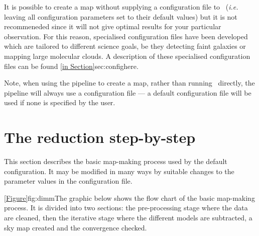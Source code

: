 It is possible to create a map without supplying a configuration file to
\makemap\ (\emph{i.e.} leaving all configuration parameters set to their default
values) but it is not recommeneded since it will not give optimal results
for your particular observation. For this reason, specialised
configuration files have been developed which are tailored to different
science goals, be they detecting faint galaxies or mapping large
molecular clouds. A description of these specialised configuration files
can be found \cref{in Section}{sec:config}{here}.

Note, when using the pipeline to create a map, rather than running
\makemap\ directly, the pipeline will always use a configuration file ---
a default configuration file will be used if none is specified by the
user.

\section{The reduction step-by-step}

This section describes the basic map-making process used by the
default configuration.  It may be modified in many ways by suitable
changes to the parameter values in the configuration file.

\cref{Figure}{fig:dimm}{The graphic below} shows the flow chart of the
basic map-making process. It is divided into two sections: the pre-processing
stage where the data are cleaned, then the iterative stage where the different
models are subtracted, a sky map created and the convergence checked.


